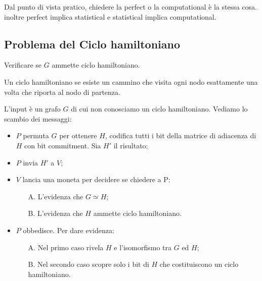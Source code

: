 \noindent Dal punto di vista pratico, chiedere la perfect o la computational è la stessa cosa. inoltre perfect implica statistical e statistical implica computational.

\subsection{Problema del Ciclo hamiltoniano}
Verificare se $G$ ammette ciclo hamiltoniano. 

\begin{definition}
    Un ciclo hamiltoniano se esiste un cammino che visita ogni nodo esattamente una volta che riporta al nodo di partenza. 
\end{definition}

\noindent L'input è un grafo $G$ di cui non conosciamo un ciclo hamiltoniano. Vediamo lo scambio dei messaggi:
\begin{itemize}
    \item $P$ permuta $G$ per ottenere $H$, codifica tutti i bit della matrice di adiacenza di $H$ con bit commitment. Sia $H'$ il risultato;
    \item $P$ invia $H'$ a $V$;
    \item $V$ lancia una moneta per decidere se chiedere a P:
    \begin{itemize}
        \item[A.] L'evidenza che $G \simeq H$;
        \item[B.] L'evidenza che $H$ ammette ciclo hamiltoniano.
    \end{itemize}
    \item $P$ obbedisce. Per dare evidenza:
    \begin{itemize}
        \item[A.] Nel primo caso rivela $H$ e l'isomorfismo tra $G$ ed $H$;
        \item[B.] Nel secondo caso scopre solo i bit di $H$ che costituiscono un ciclo hamiltoniano.
    \end{itemize}
\end{itemize}

